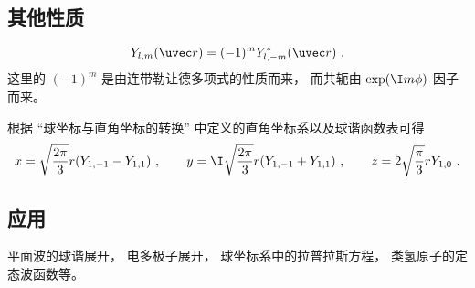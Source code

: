 \subsection{其他性质}
\begin{equation}\label{eq_SphHar_6}
Y_{l,m}(\uvec r) = (-1)^m Y_{l,-m}^*(\uvec r)~.
\end{equation}
这里的 $(-1)^m$ 是由连带勒让德多项式的性质而来， 而共轭由 $\exp(\I m\phi)$ 因子而来。

根据 “球坐标与直角坐标的转换” 中定义的直角坐标系以及球谐函数表可得
\begin{equation}\label{eq_SphHar_4}
x = \sqrt{\frac{2\pi}{3}} r (Y_{1,-1} - Y_{1,1})~, \qquad
y = \I \sqrt{\frac{2\pi}{3}} r (Y_{1,-1}+Y_{1,1})~, \qquad
z =2\sqrt{\frac{\pi}{3}} rY_{1,0}~.
\end{equation}

\subsection{应用}
平面波的球谐展开， 电多极子展开， 球坐标系中的拉普拉斯方程， 类氢原子的定态波函数等。
